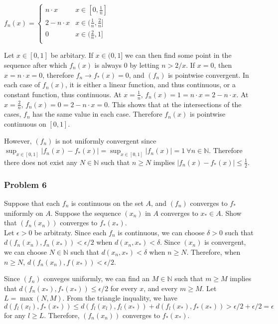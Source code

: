 \documentclass{article}
\newcommand{\N}{\mathbb{N}}
\begin{document}
\vspace{1pc}

\centerline{$f_n(x) = \begin{cases} 
      n \cdot x & x \in [0, \frac{1}{n}]\\
      2 - n \cdot x & x \in (\frac{1}{n}, \frac{2}{n}]\\
      0 & x \in (\frac{2}{n}, 1]\\ 
   \end{cases}$}
\vspace{1pc}

Let $x \in [0, 1]$ be arbitary. If $x \in (0, 1]$ we can then find some point in the sequence after which $f_n(x)$ is always $0$ by letting $n > 2/x$. If $x = 0$, then $x = n \cdot x = 0$, therefore $f_n \rightarrow f_*(x) = 0$, and $(f_n)$ is pointwise convergent. In each case of $f_n(x)$, it is either a linear function, and thus continuous, or a constant function, thus continuous. At $x = \frac{1}{n}$, $f_n(x) = 1 = n \cdot x = 2 - n \cdot x$. At $x = \frac{2}{n}$, $f_n(x) = 0 = 2 - n \cdot x = 0$. This shows that at the intersections of the cases, $f_n$ has the same value in each case.  Therefore $f_n(x)$ is pointwise continuous on $[0, 1]$. 

However, $(f_n)$ is not uniformly convergent since $\sup_{x\in[0,1]}|f_n(x) - f_*(x)| = \sup_{x\in[0,1]}|f_n(x)| = 1 \ \forall n \in \N$. Therefore there does not exist any $N \in \N$ such that $n \geq N$ implies $|f_n(x) - f_*(x)| \leq \frac{1}{2}$.

\subsubsection*{Problem 6}
Suppose that each $f_n$ is continuous on the set $A$, and $(f_n)$ converges to $f_*$ uniformly on $A$. Suppose the sequence $(x_n)$ in $A$ converges to $x_* \in A$. Show that $(f_n(x_n))$ converges to $f_*(x_*)$. \\

Let $\epsilon > 0 $ be arbitraty. Since each $f_n$ is continuous, we can choose $\delta > 0$ such that $d(f_n(x_n), f_n(x_*)) < \epsilon / 2$ when $d(x_n, x_*) < \delta$. Since $(x_n)$ is convergent, we can choose $N \in \N$ such that $d(x_n, x_*) < \delta$ when $n \geq N$. Therefore, when $n \geq N$, $d(f_n(x_n), f(x_*)) < \epsilon / 2$.

Since $(f_n)$ conveges uniformly, we can find an $M \in \N$ such that $m \geq M$ implies that $d(f_n(x_*), f_*(x_*)) \leq \epsilon / 2$ for every $x$, and every $m \geq M$. Let $L = \max(N, M)$. From the triangle inquality, we have $d(f_l(x_l), f_*(x_*)) \leq d(f_l(x_l), f_l(x_*)) + d(f_l(x_*), f_*(x_*)) > \epsilon / 2 + \epsilon / 2 = \epsilon$ for any $l \geq L$. Therefore, $(f_n(x_n))$ converges to $f_*(x_*)$.
\end{document}
